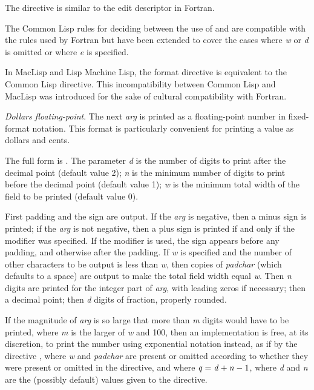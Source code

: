 \begin{flushdesc}
\beforenoterule
\begin{incompatibility}
The  directive is similar to the
 edit descriptor in Fortran.

The Common Lisp rules for deciding between the use of 
and  are compatible with the rules used by Fortran
but have been extended to cover the cases where {\it w} or {\it d}
is omitted or where {\it e} is specified.

In MacLisp and Lisp Machine Lisp, the  format directive is equivalent
to the Common Lisp \cd{{\Xtilde}{\Xatsign}*} directive.  This incompatibility between
Common Lisp and MacLisp was introduced for the sake of cultural compatibility
with Fortran.
\end{incompatibility}
\afternoterule

\item[\cd{{\Xtilde}\$}]
{\it Dollars floating-point}.  The next {\it arg} is printed as a floating-point
number in fixed-format notation.  This format is particularly
convenient for printing a value as dollars and cents.

The full form is .
The parameter {\it d} is the number
of digits to print after the decimal point (default value 2);
{\it n} is the minimum number of digits to print before the decimal
point (default value 1);
{\it w} is the minimum total width of the field to be printed (default
value 0).

First padding and the sign are output.
If the {\it arg} is negative, then a minus sign is printed;
if the {\it arg} is not negative, then a plus sign is printed
if and only if the \cd{{\Xatsign}} modifier was specified.  
If the \cd{:} modifier is used, the sign appears before any padding,
and otherwise after the padding.
If {\it w} is specified and the number of other characters to be output
is less than {\it w}, then copies of {\it padchar} (which defaults
to a space) are output to
make the total field width equal {\it w}.
Then {\it n} digits are printed for the integer part of {\it arg},
with leading zeros if necessary; then a decimal point;
then {\it d} digits of fraction, properly rounded.

If the magnitude of {\it arg} is so large that more than {\it m} digits would
have to be printed, where {\it m} is the larger of {\it w} and 100, then an
implementation is free, at its discretion, to print the number using
exponential notation instead, as if by the directive
, where {\it w} and {\it padchar} are
present or omitted according to whether they were present or omitted in
the \cd{{\Xtilde}\$} directive, and where ${\it q}={\it d}+{\it n}-1$,
where {\it d} and {\it n} are the (possibly default) values given to the
\cd{{\Xtilde}\$} directive.


\end{flushdesc}
